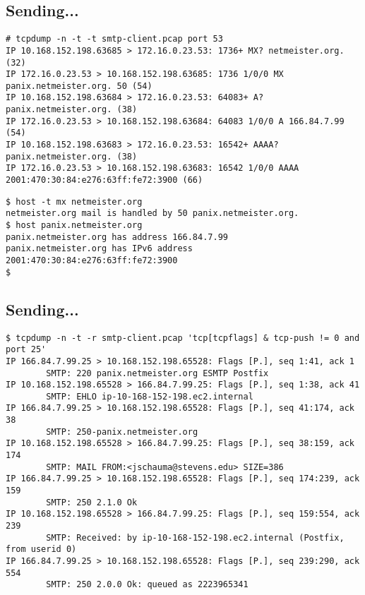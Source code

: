 \documentclass[xga]{xdvislides}
\begin{document}
\subsection{Sending...}
\begin{verbatim}
# tcpdump -n -t -t smtp-client.pcap port 53
IP 10.168.152.198.63685 > 172.16.0.23.53: 1736+ MX? netmeister.org. (32)
IP 172.16.0.23.53 > 10.168.152.198.63685: 1736 1/0/0 MX panix.netmeister.org. 50 (54)
IP 10.168.152.198.63684 > 172.16.0.23.53: 64083+ A? panix.netmeister.org. (38)
IP 172.16.0.23.53 > 10.168.152.198.63684: 64083 1/0/0 A 166.84.7.99 (54)
IP 10.168.152.198.63683 > 172.16.0.23.53: 16542+ AAAA? panix.netmeister.org. (38)
IP 172.16.0.23.53 > 10.168.152.198.63683: 16542 1/0/0 AAAA 2001:470:30:84:e276:63ff:fe72:3900 (66)
\end{verbatim}
\vspace{.5in}
\begin{verbatim}
$ host -t mx netmeister.org
netmeister.org mail is handled by 50 panix.netmeister.org.
$ host panix.netmeister.org
panix.netmeister.org has address 166.84.7.99
panix.netmeister.org has IPv6 address 2001:470:30:84:e276:63ff:fe72:3900
$ 
\end{verbatim}

\subsection{Sending...}
\begin{verbatim}
$ tcpdump -n -t -r smtp-client.pcap 'tcp[tcpflags] & tcp-push != 0 and port 25'
IP 166.84.7.99.25 > 10.168.152.198.65528: Flags [P.], seq 1:41, ack 1
        SMTP: 220 panix.netmeister.org ESMTP Postfix
IP 10.168.152.198.65528 > 166.84.7.99.25: Flags [P.], seq 1:38, ack 41
        SMTP: EHLO ip-10-168-152-198.ec2.internal
IP 166.84.7.99.25 > 10.168.152.198.65528: Flags [P.], seq 41:174, ack 38
        SMTP: 250-panix.netmeister.org
IP 10.168.152.198.65528 > 166.84.7.99.25: Flags [P.], seq 38:159, ack 174
        SMTP: MAIL FROM:<jschauma@stevens.edu> SIZE=386
IP 166.84.7.99.25 > 10.168.152.198.65528: Flags [P.], seq 174:239, ack 159
        SMTP: 250 2.1.0 Ok
IP 10.168.152.198.65528 > 166.84.7.99.25: Flags [P.], seq 159:554, ack 239
        SMTP: Received: by ip-10-168-152-198.ec2.internal (Postfix, from userid 0)
IP 166.84.7.99.25 > 10.168.152.198.65528: Flags [P.], seq 239:290, ack 554
        SMTP: 250 2.0.0 Ok: queued as 2223965341
\end{verbatim}
\end{document}
